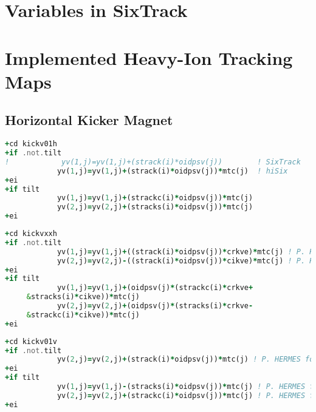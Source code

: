 \begin{appendix}
\section{Variables in SixTrack}



\section{Implemented Heavy-Ion Tracking Maps}


\subsection{Horizontal Kicker Magnet}
\begin{lstlisting}[language=Fortran,caption=Definition of the transfer map of an horizontal kicker.]
+cd kickv01h
+if .not.tilt
!            yv(1,j)=yv(1,j)+(strack(i)*oidpsv(j))        ! SixTrack
            yv(1,j)=yv(1,j)+(strack(i)*oidpsv(j))*mtc(j)  ! hiSix
+ei
+if tilt
            yv(1,j)=yv(1,j)+(strackc(i)*oidpsv(j))*mtc(j) 
            yv(2,j)=yv(2,j)+(stracks(i)*oidpsv(j))*mtc(j) 
+ei
\end{lstlisting}

\newpage
\begin{lstlisting}[language=Fortran,caption=Definition of the transfer map of an horizontal kicker.]
+cd kickvxxh
+if .not.tilt
            yv(1,j)=yv(1,j)+((strack(i)*oidpsv(j))*crkve)*mtc(j) ! P. HERMES
            yv(2,j)=yv(2,j)-((strack(i)*oidpsv(j))*cikve)*mtc(j) ! P. HERMES 
+ei
+if tilt
            yv(1,j)=yv(1,j)+(oidpsv(j)*(strackc(i)*crkve+               &
     &stracks(i)*cikve))*mtc(j)
            yv(2,j)=yv(2,j)+(oidpsv(j)*(stracks(i)*crkve-               &!hr02
     &strackc(i)*cikve))*mtc(j)                                          !hr02
+ei
\end{lstlisting}

\begin{lstlisting}[language=Fortran,caption=Definition of the transfer map of a vertical dipole kick.]
+cd kickv01v
+if .not.tilt
            yv(2,j)=yv(2,j)+(strack(i)*oidpsv(j))*mtc(j) ! P. HERMES for hiSix
+ei
+if tilt
            yv(1,j)=yv(1,j)-(stracks(i)*oidpsv(j))*mtc(j) ! P. HERMES for hiSix
            yv(2,j)=yv(2,j)+(strackc(i)*oidpsv(j))*mtc(j) ! P. HERMES for hiSix
+ei
\end{lstlisting}


\end{appendix}
